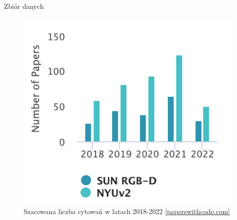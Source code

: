 \documentclass[10pt]{beamer}
\begin{document}
\begin{frame}{Zbiór danych}
    \begin{figure}
        \includegraphics[height=0.7\textheight]{images/stats-dataset.png}
        \caption[]{Szacowana liczba cytowań w latach 2018-2022 \href{https://paperswithcode.com/dataset/sun-rgb-d}{[paperswithcode.com]}}
    \end{figure}
\end{frame}
\end{document}
